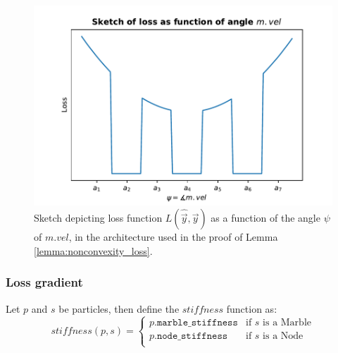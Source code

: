 \begin{figure}
    \centering
    \includegraphics{plot_nonconvex_loss.pdf}
    \caption{Sketch depicting loss function $L(\hat{\vec{y}}, \vec{y})$ as a function of the angle $\psi$ of $m.vel$, in the architecture used in the proof of Lemma \ref{lemma:nonconvexity_loss}.}
    \label{fig:nonconvexity_loss_plot}
\end{figure}

\clearpage

\subsubsection{Loss gradient}

Let $p$ and $s$ be particles, then define the $stiffness$ function as:
\begin{equation}
    stiffness(p, s) = 
    \begin{cases}
        p.\texttt{marble\_stiffness} &\text{if $s$ is a Marble} \\
        p.\texttt{node\_stiffness} &\text{if $s$ is a Node} \\
    \end{cases}
\end{equation}


